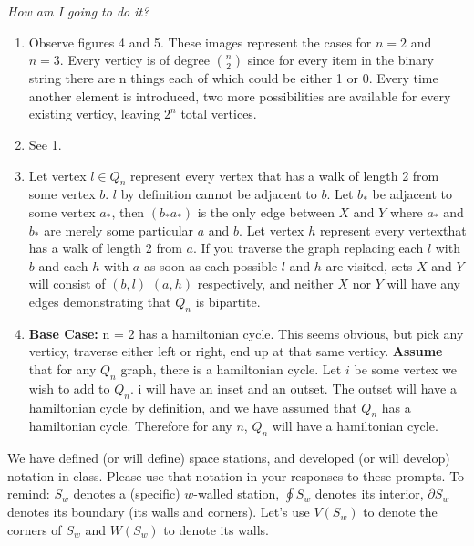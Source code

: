 \documentclass[12pt]{article}
\newenvironment{sub}[2][Sub-Experience]{\begin{trivlist}
\item[\hskip \labelsep {\bfseries #1}\hskip \labelsep {\bfseries #2.}]}{\end{trivlist}}
\begin{document}
 
\textit{How am I going to do it?}
\begin{enumerate}
\item Observe figures 4 and 5. These images represent the cases for $n = 2$ and $n = 3$. Every verticy is of degree $n \choose 2$ since for every item in the binary string there are n things each of which could be either 1 or 0. Every time another element is introduced, two more possibilities are available for every existing verticy, leaving $2^n$ total vertices.
\item See 1.
\item Let vertex $ l \in Q_n$ represent every vertex that has a walk of length 2 from some vertex $b$. $l$ by definition cannot be adjacent to $b$. Let $b_*$ be adjacent to some vertex $a_*$, then $(b_*a_*)$ is the only edge between $X$ and $Y$ where $a_*$ and $b_*$ are merely some particular $a$ and $b$. Let vertex $h$ represent every vertexthat has a walk of length 2 from $a$. If you traverse the graph replacing each $l$ with $b$ and each $h$ with $a$ as soon as each possible $l$ and $h$ are visited, sets $X$ and $Y$ will consist of $(b, l)$  $(a, h)$ respectively, and neither $X$ nor $Y$ will have any edges demonstrating that $Q_n$ is bipartite.
\item \textbf{Base Case:} n = 2 has a hamiltonian cycle. This seems obvious, but pick any verticy, traverse either left or right, end up at that same verticy. \newline
\textbf{Assume} that for any $Q_n$ graph, there is a hamiltonian cycle. \newline 
Let $i$ be some vertex we wish to add to $Q_n$. i will have an inset and an outset. The outset will have a hamiltonian cycle by definition, and we have assumed that $Q_n$ has a hamiltonian cycle. Therefore for any $n$, $Q_n$ will have a hamiltonian cycle. 

\end{enumerate}



\begin{sub}{3. Spaceship} We have defined (or will define) space stations, and developed (or will develop) notation in class.  
Please use that notation in your responses to these prompts. 
To remind: $S_w$ denotes a (specific) $w$-walled station, $\oint S_w$ denotes its interior, $\partial S_w$ denotes its boundary (its walls and corners).
Let's use $V(S_w)$ to denote the corners of $S_w$ and $W(S_w)$ to denote its walls.\\

\end{sub}
\end{document}
